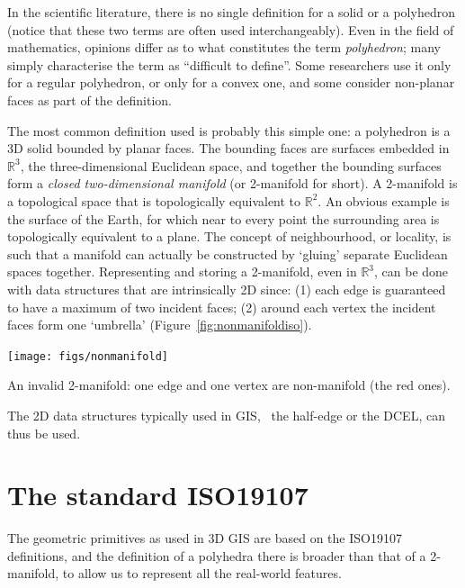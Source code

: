 In the scientific literature, there is no single definition for a solid or a polyhedron (notice that these two terms are often used interchangeably).
Even in the field of mathematics, opinions differ as to what constitutes the term \emph{polyhedron}; many simply characterise the term as ``difficult to define''. 
Some researchers use it only for a regular polyhedron, or only for a convex one, and some consider non-planar faces as part of the definition.

%

The most common definition used is probably this simple one: a polyhedron is a 3D solid bounded by planar faces. 
The bounding faces are surfaces embedded in $\mathbb{R}^3$, the three-dimen\-si\-o\-nal Euclidean space, and together the bounding surfaces form a \emph{closed two-dimensional manifold} (or 2-manifold for short).
A 2-manifold is a topological space that is topologically equivalent to $\mathbb{R}^2$. 
An obvious example is the surface of the Earth, for which near to every point the surrounding area is topologically equivalent to a plane. 
The concept of neighbourhood, or locality, is such that a manifold can actually be constructed by `gluing' separate Euclidean spaces together.
Representing and storing a 2-manifold, even in $\mathbb{R}^3$, can be done with data structures that are intrinsically 2D since: (1) each edge is guaranteed to have a maximum of two incident faces; (2) around each vertex the incident faces form one `umbrella' (Figure~\ref{fig:nonmanifoldiso}).
\begin{marginfigure}
  \centering
  \texttt{[image: figs/nonmanifold]}
  \caption[An invalid 2-manifold]{An invalid 2-manifold: one edge and one vertex are non-manifold (the red ones).}%
\label{fig:nonmanifoldiso}
\end{marginfigure}
The 2D data structures typically used in GIS, \eg\ the half-edge or the DCEL, can thus be used.



%
\section{The standard ISO19107}%
\label{sec:19107}

The geometric primitives as used in 3D GIS are based on the ISO19107 definitions, and the definition of a polyhedra there is broader than that of a 2-manifold, to allow us to represent all the real-world features.

